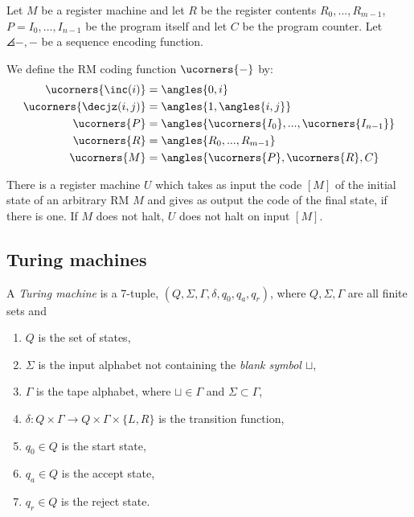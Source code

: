 \documentclass{article}
\begin{document}
\begin{definition*}[RM encoding]
	Let $M$ be a register machine and let $R$ be the register contents $R_0,...,R_{m-1}$,
	$P=I_0,...,I_{n-1}$ be the program itself and let $C$ be the program counter.
	Let $\angles{-,-}$ be a sequence encoding function.

	We define the RM coding function $\ucorners{-}$ by:
	\begin{align*}
		\ucorners{\inc(i)}     & = \angles{0,i}                                     \\
		\ucorners{\decjz(i,j)} & = \angles{1,\angles{i,j}}                          \\
		\ucorners{P}           & = \angles{\ucorners{I_0}, ..., \ucorners{I_{n-1}}} \\
		\ucorners{R}           & = \angles{R_0, ..., R_{m-1}}                       \\
		\ucorners{M}           & = \angles{\ucorners{P}, \ucorners{R}, C}
	\end{align*}
\end{definition*}

\begin{theorem*}
	There is a register machine $U$ which takes as input the code $\left[M\right]$ of the
	initial state of an arbitrary RM $M$ and gives as output the code of the final
	state, if there is one. If $M$ does not halt, $U$ does not halt on input
	$\left[M\right]$.
\end{theorem*}

\subsection{Turing machines}

\begin{definition*}[TM; Sipser]
	A \emph{Turing machine} is a 7-tuple, $(Q, \Sigma, \Gamma, \delta, q_0, q_a, q_r)$,
	where $Q,\Sigma,\Gamma$ are all finite sets and
	\begin{enumerate}
		\item $Q$ is the set of states,
		\item $\Sigma$ is the input alphabet not containing the \emph{blank symbol $\sqcup$},
		\item $\Gamma$ is the tape alphabet, where $\sqcup\in\Gamma$ and $\Sigma\subset\Gamma$,
		\item $\delta:Q\times\Gamma\to Q\times\Gamma\times\{L,R\}$ is the transition function,
		\item $q_0\in Q$ is the start state,
		\item $q_a\in Q$ is the accept state,
		\item $q_r\in Q$ is the reject state.
	\end{enumerate}
\end{definition*}
\end{document}
